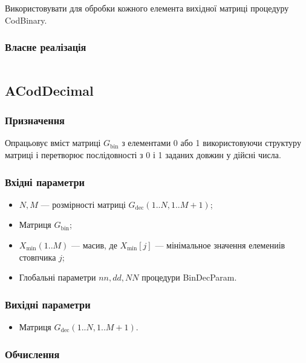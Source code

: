 \documentclass[a4paper, 12pt]{article}
\numberwithin{equation}{section}
\begin{document}
Використовувати для обробки кожного елемента вихідної матриці процедуру CodBinary.

\subsubsection*{Власне реалізація}

\inputminted[firstline=31, lastline=73]{python}{../code/cod_binary.py}

\subsection{ACodDecimal}

\subsubsection*{Призначення}

Опрацьовує вміст матриці $G_{\text{bin}}$ з елементами 0 або 1 використовуючи структуру матриці і перетворює послідовності з 0 і 1 заданих довжин у дійсні числа.

\subsubsection*{Вхідні параметри}

\begin{itemize}
    \item $N, M$ --- розмірності матриці $G_{\text{dec}}(1..N,1..M+1)$;
    \item Матриця $G_{\text{bin}}$;
    \item $X_{\text{min}}(1..M)$ --- масив, де $X_{\text{min}}[j]$ --- мінімальное значення елемениів стовпчика $j$;
    \item Глобальні параметри $nn, dd, NN$ процедури BinDecParam.
\end{itemize}

\subsubsection*{Вихідні параметри}

\begin{itemize}
    \item Матриця $G_{\text{dec}}(1..N,1..M+1)$.
\end{itemize}

\subsubsection*{Обчислення}
\end{document}
